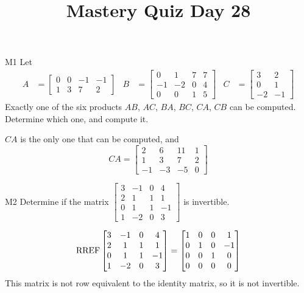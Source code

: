 \documentclass{sbgLAquiz}
\title{Mastery Quiz Day 28 }
\begin{document}
\begin{problem}{M1}
Let 
\begin{align*}
A &= \begin{bmatrix} 0 & 0 & -1 & -1 \\ 1 & 3 & 7 & 2 \end{bmatrix} & B &= \begin{bmatrix} 0 & 1 & 7 & 7 \\ -1 & -2 & 0 & 4 \\ 0 & 0 & 1 & 5 \end{bmatrix} & C&=\begin{bmatrix} 3 & 2 \\ 0 & 1 \\ -2 & -1 \end{bmatrix}
\end{align*}
Exactly one of the six products $AB$, $AC$, $BA$, $BC$, $CA$, $CB$ can be computed.  Determine which one, and compute it.
\end{problem}
\begin{solution}
$CA$ is the only one that can be computed, and 
$$CA = \begin{bmatrix} 2 & 6 & 11 & 1 \\ 1 & 3 & 7 & 2 \\ -1 & -3 & -5 & 0 \end{bmatrix}$$
\end{solution}



\begin{problem}{M2}
Determine if the matrix $\begin{bmatrix} 3 & -1 & 0 & 4 \\ 2 & 1 & 1 & 1 \\ 0 & 1 & 1 & -1 \\ 1 & -2 & 0 & 3 \end{bmatrix}$ is invertible.
\end{problem}
\begin{solution}
$$\operatorname{RREF} \begin{bmatrix} 3 & -1 & 0 & 4 \\ 2 & 1 & 1 & 1 \\ 0 & 1 & 1 & -1 \\ 1 & -2 & 0 & 3 \end{bmatrix} = \begin{bmatrix} 1 & 0 & 0 & 1 \\ 0 & 1 & 0 & -1 \\ 0 & 0 & 1 & 0 \\ 0 & 0 & 0 & 0 \end{bmatrix}$$
This matrix is not row equivalent to the identity matrix, so it is not invertible.
\end{solution}
\end{document}
